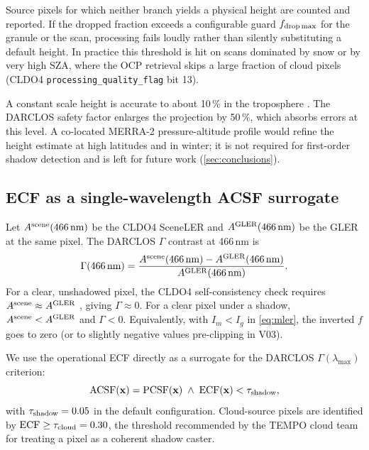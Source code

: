 \documentclass[11pt,a4paper]{article}
\newcommand{\code}[1]{\texttt{#1}}
\begin{document}
Source pixels for which neither branch yields a physical height are
counted and reported. If the dropped fraction exceeds a configurable
guard $f_{\rm drop\,max}$ for the granule or the scan, processing fails
loudly rather than silently substituting a default height. In practice
this threshold is hit on scans dominated by snow or by very high SZA,
where the OCP retrieval skips a large fraction of cloud pixels (CLDO4
\code{processing\_quality\_flag} bit 13).

A constant scale height is accurate to about 10\,\% in the troposphere
\citep{wallace2006atmospheric}. The DARCLOS safety factor enlarges the
projection by 50\,\%, which absorbs errors at this level. A
co-located MERRA-2 pressure-altitude profile would refine the height
estimate at high latitudes and in winter; it is not required for
first-order shadow detection and is left for future work
(\cref{sec:conclusions}).

\subsection{ECF as a single-wavelength ACSF surrogate}\label{sec:acsf}

Let $A^{\rm scene}(466\,\text{nm})$ be the CLDO4 SceneLER and
$A^{\rm GLER}(466\,\text{nm})$ be the GLER at the same pixel. The
DARCLOS $\Gamma$ contrast at 466\,nm is
\begin{equation}
\Gamma(466\,\text{nm}) =
\frac{A^{\rm scene}(466\,\text{nm}) - A^{\rm GLER}(466\,\text{nm})}
     {A^{\rm GLER}(466\,\text{nm})}.
\label{eq:gamma-466}
\end{equation}
For a clear, unshadowed pixel, the CLDO4 self-consistency check requires
$A^{\rm scene} \approx A^{\rm GLER}$ \citep{wang2025cldo4}, giving
$\Gamma \approx 0$. For a clear pixel under a shadow,
$A^{\rm scene} < A^{\rm GLER}$ and $\Gamma < 0$. Equivalently, with
$I_m < I_g$ in \cref{eq:mler}, the inverted $f$ goes to zero (or to
slightly negative values pre-clipping in V03).

We use the operational ECF directly as a surrogate for the DARCLOS
$\Gamma(\lambda_{\max})$ criterion:
\begin{equation}
\mathrm{ACSF}(\mathbf{x}) =
\mathrm{PCSF}(\mathbf{x})
\;\wedge\;
\mathrm{ECF}(\mathbf{x}) < \tau_{\rm shadow},
\label{eq:acsf}
\end{equation}
with $\tau_{\rm shadow} = 0.05$ in the default configuration.
Cloud-source pixels are identified by
$\mathrm{ECF} \geq \tau_{\rm cloud} = 0.30$, the threshold recommended
by the TEMPO cloud team for treating a pixel as a coherent shadow
caster.
\end{document}

